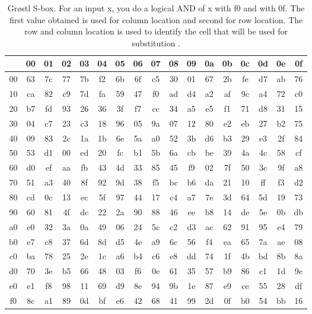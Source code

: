 \begin{table}
\begin{center}
  \begin{tabular}{ c | *{16}{c}}
     & 00 & 01 & 02 & 03 & 04 & 05 & 06 & 07 & 08 & 09 & 0a & 0b & 0c & 0d & 0e & 0f \\ \hline
  00 & 63 & 7c & 77 & 7b & f2 & 6b & 6f & c5 & 30 & 01 & 67 & 2b & fe & d7 & ab & 76 \\ 
  10 & ca & 82 & c9 & 7d & fa & 59 & 47 & f0 & ad & d4 & a2 & af & 9c & a4 & 72 & c0 \\
  20 & b7 & fd & 93 & 26 & 36 & 3f & f7 & cc & 34 & a5 & e5 & f1 & 71 & d8 & 31 & 15 \\
  30 & 04 & c7 & 23 & c3 & 18 & 96 & 05 & 9a & 07 & 12 & 80 & e2 & eb & 27 & b2 & 75 \\
  40 & 09 & 83 & 2c & 1a & 1b & 6e & 5a & a0 & 52 & 3b & d6 & b3 & 29 & e3 & 2f & 84 \\
  50 & 53 & d1 & 00 & ed & 20 & fc & b1 & 5b & 6a & cb & be & 39 & 4a & 4c & 58 & cf \\
  60 & d0 & ef & aa & fb & 43 & 4d & 33 & 85 & 45 & f9 & 02 & 7f & 50 & 3c & 9f & a8 \\
  70 & 51 & a3 & 40 & 8f & 92 & 9d & 38 & f5 & bc & b6 & da & 21 & 10 & ff & f3 & d2 \\
  80 & cd & 0c & 13 & ec & 5f & 97 & 44 & 17 & c4 & a7 & 7e & 3d & 64 & 5d & 19 & 73 \\
  90 & 60 & 81 & 4f & dc & 22 & 2a & 90 & 88 & 46 & ee & b8 & 14 & de & 5e & 0b & db \\
  a0 & e0 & 32 & 3a & 0a & 49 & 06 & 24 & 5c & c2 & d3 & ac & 62 & 91 & 95 & e4 & 79 \\
  b0 & e7 & c8 & 37 & 6d & 8d & d5 & 4e & a9 & 6c & 56 & f4 & ea & 65 & 7a & ae & 08 \\
  c0 & ba & 78 & 25 & 2e & 1c & a6 & b4 & c6 & e8 & dd & 74 & 1f & 4b & bd & 8b & 8a \\
  d0 & 70 & 3e & b5 & 66 & 48 & 03 & f6 & 0e & 61 & 35 & 57 & b9 & 86 & c1 & 1d & 9e \\
  e0 & e1 & f8 & 98 & 11 & 69 & d9 & 8e & 94 & 9b & 1e & 87 & e9 & ce & 55 & 28 & df \\
  f0 & 8c & a1 & 89 & 0d & bf & e6 & 42 & 68 & 41 & 99 & 2d & 0f & b0 & 54 & bb & 16 \\
  \end{tabular}
  \caption{Gr{\o}stl S-box. For an input x, you do a logical AND of x with f0 and with 0f.
  The first value obtained is used for column location and second for row location. The
  row and column location is used to identify the cell that will be used for substitution
  \cite{00019}.}
  \label{table:Groestlsbox}
\end{center}
\end{table}

